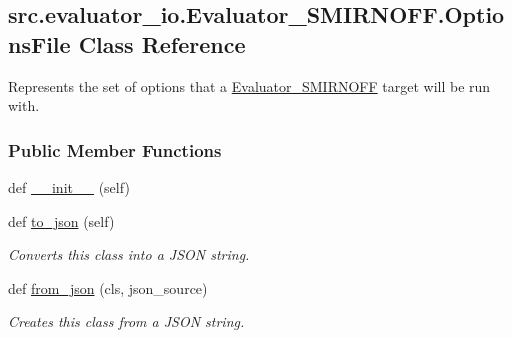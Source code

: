 \hypertarget{classsrc_1_1evaluator__io_1_1Evaluator__SMIRNOFF_1_1OptionsFile}{}\subsection{src.\+evaluator\+\_\+io.\+Evaluator\+\_\+\+S\+M\+I\+R\+N\+O\+F\+F.\+Options\+File Class Reference}
\label{classsrc_1_1evaluator__io_1_1Evaluator__SMIRNOFF_1_1OptionsFile}


Represents the set of options that a {\ttfamily \hyperlink{classsrc_1_1evaluator__io_1_1Evaluator__SMIRNOFF}{Evaluator\+\_\+\+S\+M\+I\+R\+N\+O\+FF}} target will be run with.  


\subsubsection*{Public Member Functions}
\begin{DoxyCompactItemize}
\item 
def \hyperlink{classsrc_1_1evaluator__io_1_1Evaluator__SMIRNOFF_1_1OptionsFile_a05b31ff779fa3ba3023378ee9db86b0c}{\+\_\+\+\_\+init\+\_\+\+\_\+} (self)
\item 
def \hyperlink{classsrc_1_1evaluator__io_1_1Evaluator__SMIRNOFF_1_1OptionsFile_abe5a6817f9456684926cba96c8b39040}{to\+\_\+json} (self)
\begin{DoxyCompactList}\small\item\em Converts this class into a J\+S\+ON string. \end{DoxyCompactList}\item 
def \hyperlink{classsrc_1_1evaluator__io_1_1Evaluator__SMIRNOFF_1_1OptionsFile_ad6ce4f3e9aeb47878c7cc9ef363a6b87}{from\+\_\+json} (cls, json\+\_\+source)
\begin{DoxyCompactList}\small\item\em Creates this class from a J\+S\+ON string. \end{DoxyCompactList}\end{DoxyCompactItemize}
